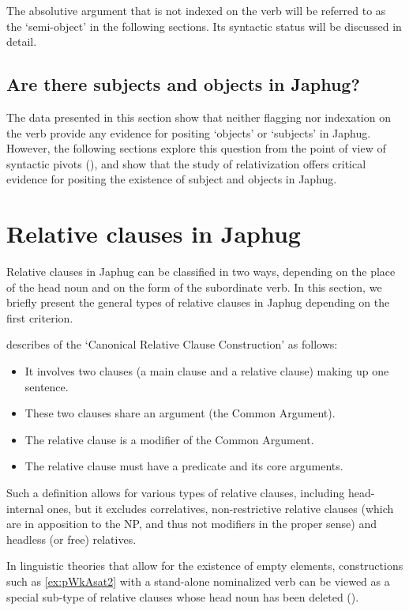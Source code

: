 \documentclass[oldfontcommands,oneside,a4paper,11pt]{article}
\begin{document}
The absolutive argument that is not indexed on the verb will be referred to as the `semi-object' in the following sections. Its  syntactic status will be discussed in detail.

\subsection{Are there subjects and objects in Japhug?}
The data presented in this section show that neither flagging nor indexation on the verb provide any evidence for positing `objects' or `subjects' in Japhug. However, the following sections explore this question from the point of view of syntactic pivots (\citealt[275]{vanvalin97syntax}), and show that the study of relativization offers critical evidence for positing the existence of subject and objects in Japhug.

\section{Relative clauses in Japhug}
Relative clauses in Japhug can be classified in two ways, depending on the place of the head noun and on the form of the subordinate verb. In this section, we briefly present  the general types of relative clauses in Japhug depending on the first criterion.  

 \citet[314]{dixon10basic2}  describes of the `Canonical Relative Clause Construction' as follows:
 
\begin{itemize}
\item It involves two clauses (a main clause and a relative clause) making up one sentence. 
\item These two clauses share an argument (the Common Argument). 
\item The relative clause is a modifier of the Common Argument. 
\item The relative clause must have a predicate and its core arguments. 
\end{itemize}
 
Such a definition allows for various types of relative clauses, including head-internal ones, but it excludes correlatives, non-restrictive relative clauses (which are in apposition to the NP, and thus not modifiers in the proper sense) and headless (or free) relatives.

In linguistic theories that  allow for the existence of empty elements, constructions such as \ref{ex:pWkAsat2} with a stand-alone nominalized verb can be viewed as a special sub-type of relative clauses whose head noun has been deleted (\citealt[197-205]{dryer07noun.phrase}). 
\end{document}
